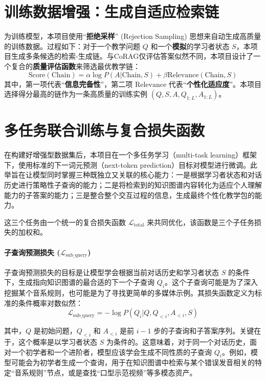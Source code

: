 \section{训练数据增强：生成自适应检索链}
为训练模型，本项目使用“\textbf{拒绝采样}” (Rejection Sampling) 思想来自动生成高质量的训练数据。过程如下：对于一个教学问题 $Q$ 和一个\textbf{模拟}的学习者状态 $S$，本项目生成多条候选的检索-生成链。与CoRAG仅评估答案似然不同，本项目设计了一个复合的\textbf{质量评估函数}来筛选最优教学链：
\begin{equation}
\text{Score}(\text{Chain}) = \alpha \log P(A | \text{Chain}, S) + \beta \text{Relevance}(\text{Chain}, S)
\end{equation}
其中，第一项代表“\textbf{信息完备性}”，第二项 $\text{Relevance}$ 代表“\textbf{个性化适应度}”。本项目选择得分最高的链作为一条高质量的训练实例 $(Q, S, A, Q_{1:L}, A_{1:L})$。

\section{多任务联合训练与复合损失函数}
在构建好增强型数据集后，本项目在一个多任务学习（multi-task learning）框架下，使用标准的下一词元预测（next-token prediction）目标对模型进行微调。此举旨在让模型同时掌握三种既独立又关联的核心能力：一是根据学习者状态和对话历史进行策略性子查询的能力；二是将检索到的知识图谱内容转化为适应个人理解能力的子答案的能力；三是整合整个交互过程的信息，生成最终个性化教学包的能力。

这三个任务由一个统一的复合损失函数 $\mathcal{L}_{\text{total}}$ 来共同优化，该函数是三个子任务损失的加权和。

\paragraph{子查询预测损失 ($\mathcal{L}_{\text{sub\_query}}$)}
子查询预测损失的目标是让模型学会根据当前对话历史和学习者状态 $S$ 的条件下，生成指向知识图谱的最合适的下一个子查询 $Q_i$。这个子查询可能是为了深入挖掘某个音系规则，也可能是为了寻找更简单的多媒体示例。其损失函数定义为标准的条件概率对数似然：
\begin{equation}
\mathcal{L}_{\text{sub\_query}} = - \log P(Q_i | Q, Q_{<i}, A_{<i}, S)
\end{equation}

其中，$Q$ 是初始问题，$Q_{<i}$ 和 $A_{<i}$ 是前 $i-1$ 步的子查询和子答案序列。关键在于，这个概率是以学习者状态 $S$ 为条件的。这意味着，对于同一个对话历史，面对一个初学者和一个进阶者，模型应该学会生成不同性质的子查询 $Q_i$。例如，模型可能会为初学者生成一个查询，用于在知识图谱中检索与某个错误发音相关的特定“音系规则”节点，或是查找“口型示范视频”等多模态资产。

